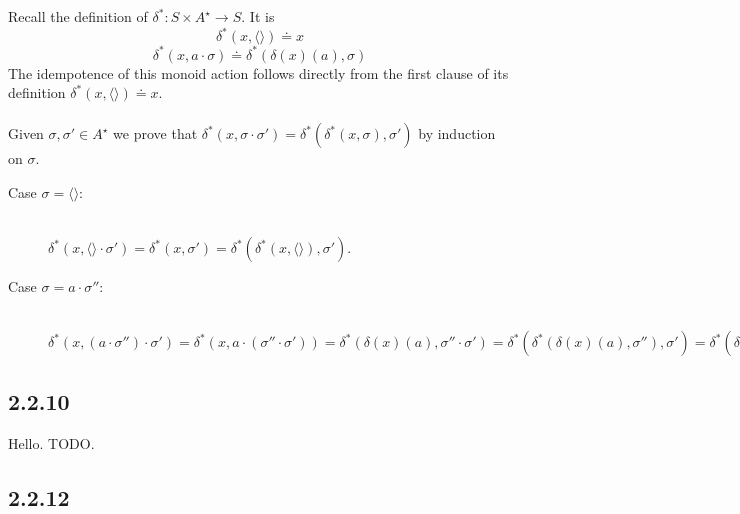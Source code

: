 \documentclass{article}
\begin{document}
Recall the definition of $\delta^* : S \times A^{\star} \to S$. It is
$$\delta^*(x, \langle \rangle) \doteq x$$
$$\delta^*(x, a \cdot \sigma) \doteq \delta^*(\delta(x)(a), \sigma)$$
The idempotence of this monoid action follows directly from the first clause of its definition 
$\delta^*(x, \langle \rangle) \doteq x$. \\~\\
Given $\sigma,\sigma' \in A^\star$ we prove that 
$\delta^*(x, \sigma \cdot \sigma') = \delta^*(\delta^*(x, \sigma), \sigma')$ by induction on $\sigma$.
\begin{description}
\item[Case $\sigma = \langle \rangle$:]~\\
$\delta^*(x, \langle \rangle \cdot \sigma') = \delta^*(x, \sigma') = \delta^*(\delta^*(x, \langle \rangle), \sigma')$.
\item[Case $\sigma = a \cdot \sigma''$:]~\\
$\delta^*(x, (a \cdot \sigma'') \cdot \sigma') = \delta^*(x, a \cdot (\sigma'' \cdot \sigma')) = 
\delta^*(\delta(x)(a), \sigma'' \cdot \sigma') = \delta^*(\delta^*(\delta(x)(a), \sigma''), \sigma')
= \delta^*(\delta^*(x,a \cdot \sigma''), \sigma')$ 
\end{description}

\subsection*{2.2.10}

Hello. TODO.

\subsection*{2.2.12}
\end{document}
